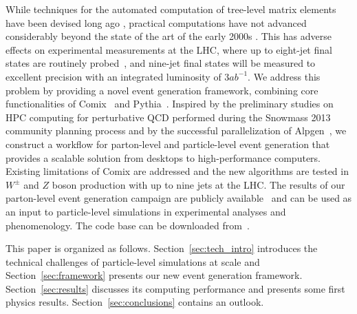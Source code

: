 \documentclass[aps,prd,twocolumn,fleqn,superscriptaddress,groupedaddress,nofootinbib,preprintnumbers]{revtex4}
\begin{document}
While techniques for the automated computation of tree-level matrix elements
have been devised long ago \cite{Berends:1987cv,Berends:1987me,Ballestrero:1994jn},
practical computations have not advanced considerably beyond the state of the art
of the early 2000s \cite{Mangano:2002ea,Gleisberg:2008fv}.
This has adverse effects on experimental measurements at the LHC,
where up to eight-jet final states are routinely probed~\cite{
  Aad:2013ysa,Aad:2014qxa,Aaboud:2017soa,Aaboud:2017hbk,
  Khachatryan:2016fue,Sirunyan:2017wgx,Sirunyan:2018cpw,Khachatryan:2016crw},
and nine-jet final states will be measured to excellent precision with an
integrated luminosity of $3{ab}^{-1}$.
We address this problem by providing a novel event generation framework,
combining core functionalities of Comix~\cite{Gleisberg:2008fv} and
Pythia~\cite{Sjostrand:2014zea}. Inspired by the preliminary studies
on HPC computing for perturbative QCD performed during the Snowmass 2013
community planning process \cite{Hoche:2013zja,Bauerdick:2014qka}
and by the successful parallelization of Alpgen~\cite{Childers:2015tyv},
we construct a workflow for parton-level and particle-level event generation
that provides a scalable solution from desktops to high-performance computers.
Existing limitations of Comix \cite{Benjamin:2017xdd} are addressed
and the new algorithms are tested in $W^\pm$ and $Z$ boson production with
up to nine jets at the LHC. The results of our parton-level event generation
campaign are publicly available~\cite{schulz_holger_2019_2678039,
  schulz_holger_2019_2678055,schulz_holger_2019_2678091}
and can be used as an input to particle-level simulations
in experimental analyses and phenomenology.
The code base can be downloaded from~\cite{hpcgenrepo}.

This paper is organized as follows. Section~\ref{sec:tech_intro}
introduces the technical challenges of particle-level simulations
at scale and Section~\ref{sec:framework} presents our new event generation framework.
Section~\ref{sec:results} discusses its computing performance and
presents some first physics results.
Section~\ref{sec:conclusions} contains an outlook.
\end{document}
